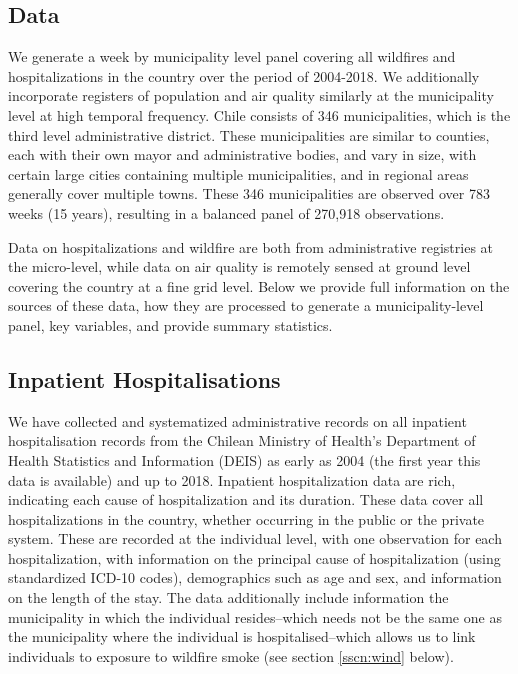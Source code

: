\documentclass[11pt]{article}
\begin{document}
\begin{spacing}{1.3}
\section{Data}
\label{scn:data} 
We generate a week by municipality level panel covering all wildfires and hospitalizations in the country over the period of 2004-2018.  We additionally incorporate registers of population and air quality similarly at the municipality level at high temporal frequency.  Chile consists of 346 municipalities, which is the third level administrative district.  These municipalities are similar to counties, each with their own mayor and administrative bodies, and vary in size, with certain large cities containing multiple municipalities, and in regional areas generally cover multiple towns.  These 346 municipalities are observed over 783 weeks (15 years), resulting in a balanced panel of 270,918 observations.

Data on hospitalizations and wildfire are both from administrative registries at the micro-level, while data on air quality is remotely sensed at ground level covering the country at a fine grid level.  Below we provide full information on the sources of these data, how they are processed to generate a municipality-level panel, key variables, and provide summary statistics. 

\subsection{Inpatient Hospitalisations}
\label{sscn:hospitalisations} 
We have collected and systematized administrative records on all inpatient hospitalisation records from the Chilean Ministry of Health's Department of Health Statistics and Information (DEIS) as early as 2004 (the first year this data is available) and up to 2018. Inpatient hospitalization data are rich, indicating each cause of hospitalization and its duration.  These data cover all hospitalizations in the country, whether occurring in the public or the private system. These are recorded at the individual level, with one observation for each hospitalization, with information on the principal cause of hospitalization (using standardized ICD-10 codes), demographics such as age and sex, and information on the length of the stay.  The data additionally include information the municipality in which the individual resides--which needs not be the same one as the municipality where the individual is hospitalised--which allows us to link individuals to exposure to wildfire smoke (see section \ref{sscn:wind} below). 


\end{spacing}
\end{document}
